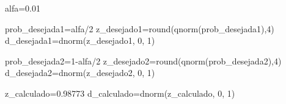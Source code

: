 \documentclass[
]{book}
\newenvironment{Shaded}{\begin{snugshade}}{\end{snugshade}}
\newcommand{\DecValTok}[1]{\textcolor[rgb]{0.00,0.00,0.81}{#1}}
\newcommand{\FloatTok}[1]{\textcolor[rgb]{0.00,0.00,0.81}{#1}}
\newcommand{\FunctionTok}[1]{\textcolor[rgb]{0.00,0.00,0.00}{#1}}
\newcommand{\NormalTok}[1]{#1}
\newcommand{\OtherTok}[1]{\textcolor[rgb]{0.56,0.35,0.01}{#1}}
\newcommand{\SpecialCharTok}[1]{\textcolor[rgb]{0.00,0.00,0.00}{#1}}
\begin{document}
\hfill\break

\begin{Shaded}
\begin{Highlighting}[]
\NormalTok{alfa}\OtherTok{=}\FloatTok{0.01}

\NormalTok{prob\_desejada1}\OtherTok{=}\NormalTok{alfa}\SpecialCharTok{/}\DecValTok{2}
\NormalTok{z\_desejado1}\OtherTok{=}\FunctionTok{round}\NormalTok{(}\FunctionTok{qnorm}\NormalTok{(prob\_desejada1),}\DecValTok{4}\NormalTok{)}
\NormalTok{d\_desejada1}\OtherTok{=}\FunctionTok{dnorm}\NormalTok{(z\_desejado1, }\DecValTok{0}\NormalTok{, }\DecValTok{1}\NormalTok{)}

\NormalTok{prob\_desejada2}\OtherTok{=}\DecValTok{1}\SpecialCharTok{{-}}\NormalTok{alfa}\SpecialCharTok{/}\DecValTok{2}
\NormalTok{z\_desejado2}\OtherTok{=}\FunctionTok{round}\NormalTok{(}\FunctionTok{qnorm}\NormalTok{(prob\_desejada2),}\DecValTok{4}\NormalTok{)}
\NormalTok{d\_desejada2}\OtherTok{=}\FunctionTok{dnorm}\NormalTok{(z\_desejado2, }\DecValTok{0}\NormalTok{, }\DecValTok{1}\NormalTok{)}

\NormalTok{z\_calculado}\OtherTok{=}\FloatTok{0.98773}
\NormalTok{d\_calculado}\OtherTok{=}\FunctionTok{dnorm}\NormalTok{(z\_calculado, }\DecValTok{0}\NormalTok{, }\DecValTok{1}\NormalTok{)}



\end{Highlighting}
\end{Shaded}
\end{document}
